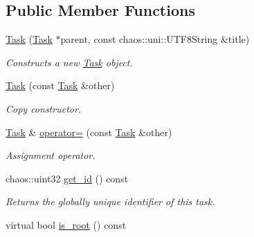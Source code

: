 \subsection*{Public Member Functions}
\begin{DoxyCompactItemize}
\item 
\hyperlink{classsigma_1_1core_1_1tasks_1_1_task_ad0c18c7b0fc306cf4fe6f133766b2779}{Task} (\hyperlink{classsigma_1_1core_1_1tasks_1_1_task}{Task} $\ast$parent, const chaos\-::uni\-::\-U\-T\-F8\-String \&title)
\begin{DoxyCompactList}\small\item\em Constructs a new \hyperlink{classsigma_1_1core_1_1tasks_1_1_task}{Task} object. \end{DoxyCompactList}\item 
\hyperlink{classsigma_1_1core_1_1tasks_1_1_task_a222255707537a07f64c687c87efef1e6}{Task} (const \hyperlink{classsigma_1_1core_1_1tasks_1_1_task}{Task} \&other)
\begin{DoxyCompactList}\small\item\em Copy constructor. \end{DoxyCompactList}\item 
\hyperlink{classsigma_1_1core_1_1tasks_1_1_task}{Task} \& \hyperlink{classsigma_1_1core_1_1tasks_1_1_task_a0d81a85b0cf3dc36a8d5a653d152075e}{operator=} (const \hyperlink{classsigma_1_1core_1_1tasks_1_1_task}{Task} \&other)
\begin{DoxyCompactList}\small\item\em Assignment operator. \end{DoxyCompactList}\item 
chaos\-::uint32 \hyperlink{classsigma_1_1core_1_1tasks_1_1_task_ae701da71b09d846ef31c5781937a79c8}{get\-\_\-id} () const 
\begin{DoxyCompactList}\small\item\em Returns the globally unique identifier of this task. \end{DoxyCompactList}\item 
\hypertarget{classsigma_1_1core_1_1tasks_1_1_task_a615ceebc720367c0b26652163118bcb9}{virtual bool \hyperlink{classsigma_1_1core_1_1tasks_1_1_task_a615ceebc720367c0b26652163118bcb9}{is\-\_\-root} () const }\label{classsigma_1_1core_1_1tasks_1_1_task_a615ceebc720367c0b26652163118bcb9}


\end{DoxyCompactItemize}
